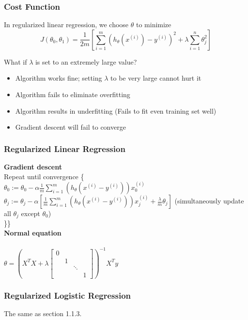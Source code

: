 \documentclass{article}
\newcommand\tab[1][1cm]{\hspace*{#1}}
\begin{document}
\subsubsection{Cost Function}
In regularized linear regression, we choose $\theta$ to minimize
$$J(\theta_0, \theta_1) = \frac{1}{2m}[ \sum_{i=1}^{m}(h_\theta(x^{(i)}) - y^{(i)})^2 + \lambda \sum_{i=1}^n \theta_{j}^2]$$

What if $\lambda$ is set to an extremely large value?
\begin{itemize}
  \item Algorithm works fine; setting $\lambda$ to be very large cannot hurt it
  \item Algorithm fails to eliminate overfitting
  \item Algorithm results in underfitting (Fails to fit even training set well)
  \item Gradient descent will fail to converge
\end{itemize}

\subsubsection{Regularized Linear Regression}
\textbf{Gradient descent}\\
Repeat until convergence \{\\
\tab $\theta_0 := \theta_0 - \alpha \frac{1}{m} \sum_{i=1}^{m}(h_\theta(x^{(i)} - y^{(i)})) x_{0}^{(i)}$ \\
\tab $\theta_j := \theta_j - \alpha [\frac{1}{m} \sum_{i=1}^{m}(h_\theta(x^{(i)} - y^{(i)})) x_{j}^{(i)} + \frac{\lambda}{m}\theta_j]$ (simultaneously update all $\theta_j$ except $\theta_0$) \\
\}\}\\

\textbf{Normal equation}\\\\
$\theta = (X^TX + \lambda \begin{bmatrix}
    0 & & & \\
    & 1 & & \\
    & & \ddots & \\
    & & & 1
  \end{bmatrix})^{-1} X^T y$

\subsubsection{Regularized Logistic Regression}
The same as section 1.1.3.
\end{document}
